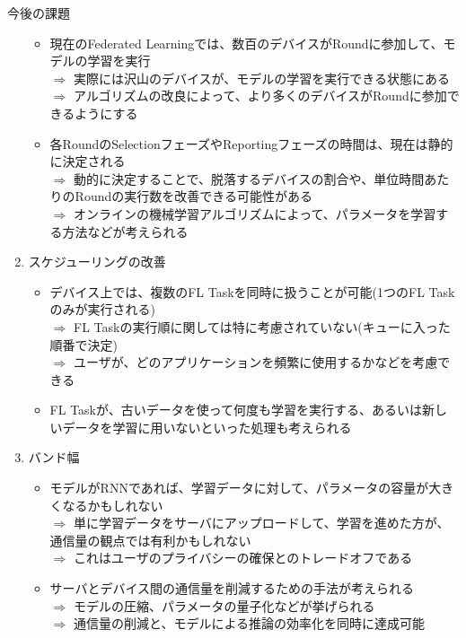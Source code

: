 \documentclass[dvipdfmx,notheorems,t]{beamer}
\begin{document}
\begin{frame}{今後の課題}
\begin{enumerate}
\begin{itemize}
		\item 現在のFederated Learningでは、数百のデバイスがRoundに参加して、モデルの学習を実行 \\
		$\Rightarrow$ 実際には沢山のデバイスが、モデルの学習を実行できる状態にある \\
		$\Rightarrow$ アルゴリズムの改良によって、より多くのデバイスがRoundに参加できるようにする
		\newline
		
		\item 各RoundのSelectionフェーズやReportingフェーズの時間は、現在は静的に決定される \\
		$\Rightarrow$ 動的に決定することで、脱落するデバイスの割合や、単位時間あたりのRoundの実行数を改善できる可能性がある \\
		$\Rightarrow$ オンラインの機械学習アルゴリズムによって、パラメータを学習する方法などが考えられる
	\end{itemize}
	
	\framebreak
	
	\item スケジューリングの改善
	\begin{itemize}
		\item デバイス上では、複数のFL Taskを同時に扱うことが可能(1つのFL Taskのみが実行される) \\
		$\Rightarrow$ FL Taskの実行順に関しては特に考慮されていない(キューに入った順番で決定) \\
		$\Rightarrow$ ユーザが、どのアプリケーションを頻繁に使用するかなどを考慮できる
		\newline
		
		\item FL Taskが、古いデータを使って何度も学習を実行する、あるいは新しいデータを学習に用いないといった処理も考えられる
	\end{itemize}
	
	\framebreak
	
	\item バンド幅
	\begin{itemize}
		\item モデルがRNNであれば、学習データに対して、パラメータの容量が大きくなるかもしれない \\
		$\Rightarrow$ 単に学習データをサーバにアップロードして、学習を進めた方が、通信量の観点では有利かもしれない \\
		$\Rightarrow$ これはユーザのプライバシーの確保とのトレードオフである
		\newline
		
		\item サーバとデバイス間の通信量を削減するための手法が考えられる \\
		$\Rightarrow$ モデルの圧縮、パラメータの量子化などが挙げられる \\
		$\Rightarrow$ 通信量の削減と、モデルによる推論の効率化を同時に達成可能
	\end{itemize}
	

\end{enumerate}
\end{frame}
\end{document}
